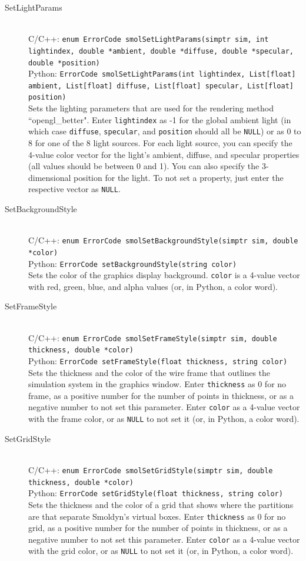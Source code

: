 \documentclass {book}
\newcommand {\ttt} {\texttt}
\begin{document}
\begin{description}
\item[SetLightParams]
\hfill \\
C/C++: \ttt{enum ErrorCode smolSetLightParams(simptr sim, int lightindex, double *ambient, double *diffuse, double *specular, double *position)}\\
Python: \ttt{ErrorCode smolSetLightParams(int lightindex, List[float] ambient, List[float] diffuse, List[float] specular, List[float] position)}\\
Sets the lighting parameters that are used for the rendering method ``opengl\_better". Enter \ttt{lightindex} as -1 for the global ambient light (in which case \ttt{diffuse}, \ttt{specular}, and \ttt{position} should all be \ttt{NULL}) or as 0 to 8 for one of the 8 light sources. For each light source, you can specify the 4-value color vector for the light's ambient, diffuse, and specular properties (all values should be between 0 and 1). You can also specify the 3-dimensional position for the light. To not set a property, just enter the respective vector as \ttt{NULL}.

\item[SetBackgroundStyle]
\hfill \\
C/C++: \ttt{enum ErrorCode smolSetBackgroundStyle(simptr sim, double *color)}\\
Python: \ttt{ErrorCode setBackgroundStyle(string color)}\\
Sets the color of the graphics display background. \ttt{color} is a 4-value vector with red, green, blue, and alpha values (or, in Python, a color word).

\item[SetFrameStyle]
\hfill \\
C/C++: \ttt{enum ErrorCode smolSetFrameStyle(simptr sim, double thickness, double *color)}\\
Python: \ttt{ErrorCode setFrameStyle(float thickness, string color)}\\
Sets the thickness and the color of the wire frame that outlines the simulation system in the graphics window. Enter \ttt{thickness} as 0 for no frame, as a positive number for the number of points in thickness, or as a negative number to not set this parameter. Enter \ttt{color} as a 4-value vector with the frame color, or as \ttt{NULL} to not set it (or, in Python, a color word).

\item[SetGridStyle]
\hfill \\
C/C++: \ttt{enum ErrorCode smolSetGridStyle(simptr sim, double thickness, double *color)}\\
Python: \ttt{ErrorCode setGridStyle(float thickness, string color)}\\
Sets the thickness and the color of a grid that shows where the partitions are that separate Smoldyn's virtual boxes. Enter \ttt{thickness} as 0 for no grid, as a positive number for the number of points in thickness, or as a negative number to not set this parameter. Enter \ttt{color} as a 4-value vector with the grid color, or as \ttt{NULL} to not set it (or, in Python, a color word).


\end{description}
\end{document}
